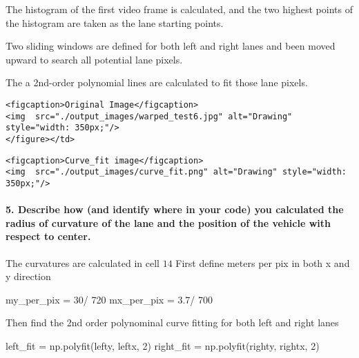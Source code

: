 \documentclass[11pt]{article}
\newenvironment{Shaded}{}{}
\newcommand{\DecValTok}[1]{\textcolor[rgb]{0.25,0.63,0.44}{{#1}}}
\newcommand{\FloatTok}[1]{\textcolor[rgb]{0.25,0.63,0.44}{{#1}}}
\newcommand{\NormalTok}[1]{{#1}}
\newcommand{\OperatorTok}[1]{\textcolor[rgb]{0.40,0.40,0.40}{{#1}}}
\begin{document}
The histogram of the first video frame is calculated, and the two
highest points of the histogram are taken as the lane starting points.

Two sliding windows are defined for both left and right lanes and been
moved upward to search all potential lane pixels.

The a 2nd-order polynomial lines are calculated to fit those lane
pixels.

\begin{verbatim}
<figcaption>Original Image</figcaption>
<img  src="./output_images/warped_test6.jpg" alt="Drawing" style="width: 350px;"/>
</figure></td>
\end{verbatim}

\begin{verbatim}
<figcaption>Curve_fit image</figcaption>
<img  src="./output_images/curve_fit.png" alt="Drawing" style="width: 350px;"/>
\end{verbatim}

\paragraph{5. Describe how (and identify where in your code) you
calculated the radius of curvature of the lane and the position of the
vehicle with respect to
center.}\label{describe-how-and-identify-where-in-your-code-you-calculated-the-radius-of-curvature-of-the-lane-and-the-position-of-the-vehicle-with-respect-to-center.}

The curvatures are calculated in cell \(14\) First define meters per pix
in both x and y direction

\begin{Shaded}
\begin{Highlighting}[]
\NormalTok{my_per_pix }\OperatorTok{=} \DecValTok{30}\OperatorTok{/} \DecValTok{720}
\NormalTok{mx_per_pix }\OperatorTok{=} \FloatTok{3.7}\OperatorTok{/} \DecValTok{700}
\end{Highlighting}
\end{Shaded}

Then find the 2nd order polynominal curve fitting for both left and
right lanes

\begin{Shaded}
\begin{Highlighting}[]
\NormalTok{left_fit }\OperatorTok{=}\NormalTok{ np.polyfit(lefty, leftx, }\DecValTok{2}\NormalTok{)}
\NormalTok{right_fit }\OperatorTok{=}\NormalTok{ np.polyfit(righty, rightx, }\DecValTok{2}\NormalTok{)}
\end{Highlighting}
\end{Shaded}
\end{document}
